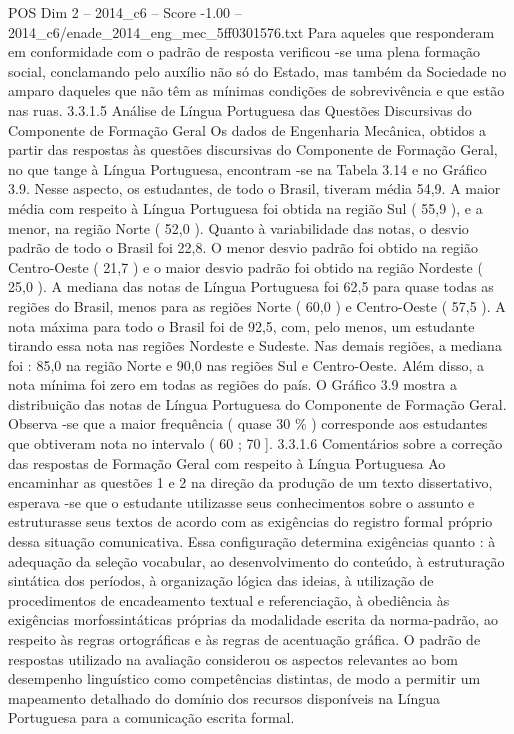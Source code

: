 \begin{textsample}{POS Dim 2 – 2014\_c6 – Score -1.00 – 2014\_c6/enade\_2014\_eng\_mec\_5ff0301576.txt}
Para aqueles que responderam em conformidade com o padrão de resposta verificou -se uma plena formação social, conclamando pelo auxílio não só do Estado, mas também da Sociedade no amparo daqueles que não têm as mínimas condições de sobrevivência e que estão nas ruas. 3.3.1.5 Análise de Língua Portuguesa das Questões Discursivas do Componente de Formação Geral Os dados de Engenharia Mecânica, obtidos a partir das respostas às questões discursivas do Componente de Formação Geral, no que tange à Língua Portuguesa, encontram -se na Tabela 3.14 e no Gráfico 3.9.
Nesse aspecto, os estudantes, de todo o Brasil, tiveram média 54,9.
A maior média com respeito à Língua Portuguesa foi obtida na região Sul ( 55,9 ), e a menor, na região Norte ( 52,0 ).
Quanto à variabilidade das notas, o desvio padrão de todo o Brasil foi 22,8.
O menor desvio padrão foi obtido na região Centro-Oeste ( 21,7 ) e o maior desvio padrão foi obtido na região Nordeste ( 25,0 ).
A mediana das notas de Língua Portuguesa foi 62,5 para quase todas as regiões do Brasil, menos para as regiões Norte ( 60,0 ) e Centro-Oeste ( 57,5 ).
A nota máxima para todo o Brasil foi de 92,5, com, pelo menos, um estudante tirando essa nota nas regiões Nordeste e Sudeste.
Nas demais regiões, a mediana foi : 85,0 na região Norte e 90,0 nas regiões Sul e Centro-Oeste.
Além disso, a nota mínima foi zero em todas as regiões do país.
O Gráfico 3.9 mostra a distribuição das notas de Língua Portuguesa do Componente de Formação Geral.
Observa -se que a maior frequência ( quase 30 \% ) corresponde aos estudantes que obtiveram nota no intervalo ( 60 ; 70 ]. 3.3.1.6 Comentários sobre a correção das respostas de Formação Geral com respeito à Língua Portuguesa Ao encaminhar as questões 1 e 2 na direção da produção de um texto dissertativo, esperava -se que o estudante utilizasse seus conhecimentos sobre o assunto e estruturasse seus textos de acordo com as exigências do registro formal próprio dessa situação comunicativa.
Essa configuração determina exigências quanto : à adequação da seleção vocabular, ao desenvolvimento do conteúdo, à estruturação sintática dos períodos, à organização lógica das ideias, à utilização de procedimentos de encadeamento textual e referenciação, à obediência às exigências morfossintáticas próprias da modalidade escrita da norma-padrão, ao respeito às regras ortográficas e às regras de acentuação gráfica.
O padrão de respostas utilizado na avaliação considerou os aspectos relevantes ao bom desempenho linguístico como competências distintas, de modo a permitir um mapeamento detalhado do domínio dos recursos disponíveis na Língua Portuguesa para a comunicação escrita formal.

\end{textsample}
